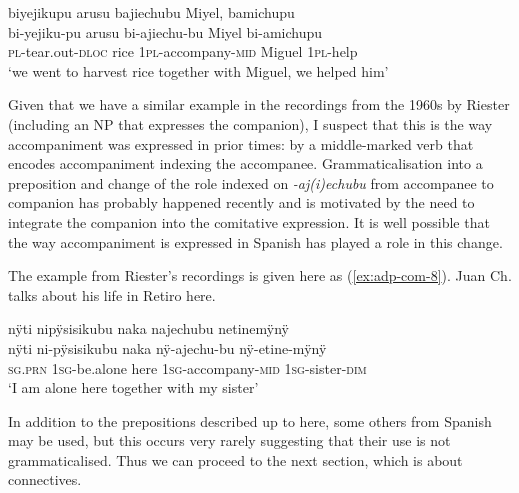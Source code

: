 \ea\label{ex:adp-com-7}
\begingl
\glpreamble biyejikupu arusu bajiechubu Miyel, bamichupu\\
\gla bi-yejiku-pu arusu bi-ajiechu-bu Miyel bi-amichupu\\
\textsc{pl}-tear.out-\textsc{dloc} rice 1\textsc{pl}-accompany-\textsc{mid} Miguel 1\textsc{pl}-help\\
\glft ‘we went to harvest rice together with Miguel, we helped him’
\endgl
\trailingcitation{[oxx-e120414ls-1a.120]}
\xe

Given that we have a similar example in the recordings from the 1960s by Riester (including an NP that expresses the companion), I suspect that this is the way accompaniment was expressed in prior times: by a middle-marked verb that encodes accompaniment indexing the accompanee. Grammaticalisation into a preposition and change of the role indexed on \textit{-aj(i)echubu} from accompanee to companion has probably happened recently and is motivated by the need to integrate the companion into the comitative expression. It is well possible that the way accompaniment is expressed in Spanish has played a role in this change.

The example from Riester’s recordings is given here as (\ref{ex:adp-com-8}). Juan Ch. talks about his life in Retiro here.

\ea\label{ex:adp-com-8}
\begingl
\glpreamble nÿti nipÿsisikubu naka najechubu netinemÿnÿ\\
\gla nÿti ni-pÿsisikubu naka nÿ-ajechu-bu nÿ-etine-mÿnÿ\\
\textsc{sg.prn} 1\textsc{sg}-be.alone here 1\textsc{sg}-accompany-\textsc{mid} 1\textsc{sg}-sister-\textsc{dim}\\
\glft ‘I am alone here together with my sister’
\endgl
\trailingcitation{[nxx-p630101g-1.163-164]}
\xe


In addition to the prepositions described up to here, some others from Spanish may be used, but this occurs very rarely suggesting that their use is not grammaticalised. Thus we can proceed to the next section, which is about connectives.
